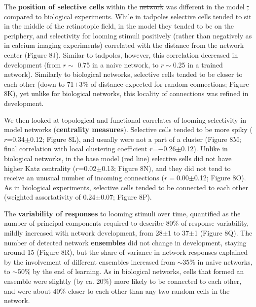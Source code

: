 \documentclass{article}
\providecommand{\DIFaddtex}[1]{{\protect\color{blue}{#1}}} %
\providecommand{\DIFdeltex}[1]{{\protect\color{red}\sout{#1}}}                      %
\providecommand{\DIFaddbegin}{} %
\providecommand{\DIFaddend}{} %
\providecommand{\DIFdelbegin}{} %
\providecommand{\DIFdelend}{} %
\providecommand{\DIFadd}[1]{\texorpdfstring{\DIFaddtex{#1}}{#1}} %
\providecommand{\DIFdel}[1]{\texorpdfstring{\DIFdeltex{#1}}{}} %
\newcommand{\DIFscaledelfig}{0.5}
\newlength{\DIFdelgraphicswidth} %
\newlength{\DIFdelgraphicsheight} %
\newcommand{\DIFaddincludegraphics}[2][]{{\color{blue}\fbox{\DIFOincludegraphics[#1]{#2}}}} %
\newcommand{\DIFdelincludegraphics}[2][]{%
\sbox{\DIFdelgraphicsbox}{\DIFOincludegraphics[#1]{#2}}%
\settoboxwidth{\DIFdelgraphicswidth}{\DIFdelgraphicsbox} %
\settoboxtotalheight{\DIFdelgraphicsheight}{\DIFdelgraphicsbox} %
\scalebox{\DIFscaledelfig}{%
\parbox[b]{\DIFdelgraphicswidth}{\usebox{\DIFdelgraphicsbox}\\[-\baselineskip] \rule{\DIFdelgraphicswidth}{0em}}\llap{\resizebox{\DIFdelgraphicswidth}{\DIFdelgraphicsheight}{%
\setlength{\unitlength}{\DIFdelgraphicswidth}%
\begin{picture}(1,1)%
\thicklines\linethickness{2pt} %
{\color[rgb]{1,0,0}\put(0,0){\framebox(1,1){}}}%
{\color[rgb]{1,0,0}\put(0,0){\line( 1,1){1}}}%
{\color[rgb]{1,0,0}\put(0,1){\line(1,-1){1}}}%
\end{picture}%
}\hspace*{3pt}}} %
} %
\DeclareRobustCommand{\DIFaddbegin}{\DIFOaddbegin \let\includegraphics\DIFaddincludegraphics} %
\DeclareRobustCommand{\DIFaddend}{\DIFOaddend \let\includegraphics\DIFOincludegraphics} %
\DeclareRobustCommand{\DIFdelbegin}{\DIFOdelbegin \let\includegraphics\DIFdelincludegraphics} %
\DeclareRobustCommand{\DIFdelend}{\DIFOaddend \let\includegraphics\DIFOincludegraphics} %
\begin{document}
The \textbf{position of selective cells} within the \DIFdelbegin \DIFdel{network }\DIFdelend \DIFaddbegin \DIFadd{visual field }\DIFaddend was different in the model \DIFdelbegin \DIFdel{, }\DIFdelend compared to biological experiments. While in tadpoles selective cells tended to sit in the middle of the retinotopic field, in the model they tended to be on the periphery, and selectivity for looming stimuli positively (rather than negatively as in calcium imaging experiments) correlated with the distance from the network center (Figure 8J). Similar to tadpoles, however, this correlation decreased in development (from $r\sim$ 0.75 in a naive network, to $r\sim$0.25 in a trained network). Similarly to biological networks, selective cells tended to be closer to each other (down to 71$\pm$3\% of distance expected for random connections; Figure 8K), yet unlike for biological networks, this locality of connections was refined in development.

We then looked at topological and functional correlates of looming selectivity in model networks (\textbf{centrality measures}). Selective cells tended to be more spiky ($r$=0.34$\pm$0.12; Figure 8L), and usually were not a part of a cluster (Figure 8M; final correlation with local clustering coefficient $r$=$-$0.26$\pm$0.12). Unlike in biological networks, in the base model (red line) selective sells did not have higher Katz centrality ($r$=0.02$\pm$0.13; Figure 8N), and they did not tend to receive an unusual number of incoming connections ($r=$0.00$\pm$0.12; Figure 8O). As in biological experiments, selective cells tended to be connected to each other (weighted assortativity of 0.24$\pm$0.07; Figure 8P). %
\DIFaddbegin \DIFadd{In naive networks, the majority ($\sim$85\%) of strong edges (top 50\% of edges by weight) tended to lead from less selective sells to more selective ones, but in developed networks this share was reduced to chance value (51$\pm$0.03), matching results from biological networks.
}\DIFaddend 

The \textbf{variability of responses} to looming stimuli over time, quantified as the number of principal components required to describe 80\% of response variability, mildly increased with network development, from 28$\pm$1 to 37$\pm$1 (Figure 8Q). The number of detected network \textbf{ensembles} did not change in development, staying around 15 (Figure 8R), but the share of variance in network responses explained by the involvement of different ensembles increased from $\sim$35\% in naive networks, to $\sim$50\% by the end of learning. As in biological networks, cells that formed an ensemble were slightly (by ca. 20\%) more likely to be connected to each other, and were about 40\% closer to each other than any two random cells in the network.
\end{document}
